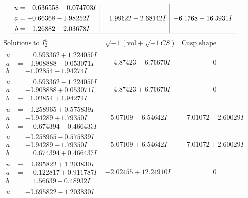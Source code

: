 \documentclass[1p]{elsarticle_modified}
\theoremstyle{definition}
\newcommand{\I}{\sqrt{-1}}
\begin{document}
$$\begin{array}{c|c|c}
\begin{aligned}
u &= -0.636558 - 0.074703 I \\
a &= -0.66368 - 1.98252 I \\
b &= -1.26882 - 2.03678 I\end{aligned}
 & \phantom{-}1.99622 - 2.68142 I & -6.1768 - 16.3931 I\\
 \hline 
 \end{array}$$\newpage$$\begin{array}{c|c|c}  
\text{Solutions to }I^u_{2}& \I (\text{vol} + \sqrt{-1}CS) & \text{Cusp shape}\\
 \hline 
\begin{aligned}
u &= \phantom{-}0.593362 + 1.224050 I \\
a &= -0.908888 - 0.053071 I \\
b &= -1.02854 - 1.94274 I\end{aligned}
 & \phantom{-}4.87423 - 6.70670 I & \phantom{-0.000000 } 0 \\ \hline\begin{aligned}
u &= \phantom{-}0.593362 - 1.224050 I \\
a &= -0.908888 + 0.053071 I \\
b &= -1.02854 + 1.94274 I\end{aligned}
 & \phantom{-}4.87423 + 6.70670 I & \phantom{-0.000000 } 0 \\ \hline\begin{aligned}
u &= -0.258965 + 0.575839 I \\
a &= -0.94289 + 1.79350 I \\
b &= \phantom{-}0.674394 - 0.466433 I\end{aligned}
 & -5.07109 - 6.54642 I & -7.01072 - 2.60029 I \\ \hline\begin{aligned}
u &= -0.258965 - 0.575839 I \\
a &= -0.94289 - 1.79350 I \\
b &= \phantom{-}0.674394 + 0.466433 I\end{aligned}
 & -5.07109 + 6.54642 I & -7.01072 + 2.60029 I \\ \hline\begin{aligned}
u &= -0.695822 + 1.203830 I \\
a &= \phantom{-}0.122817 + 0.911787 I \\
b &= \phantom{-}1.56639 - 0.48932 I\end{aligned}
 & -2.02455 + 12.24910 I & \phantom{-0.000000 } 0 \\ \hline\begin{aligned}
u &= -0.695822 - 1.203830 I \\

\end{aligned}
\end{array}$$
\end{document}
